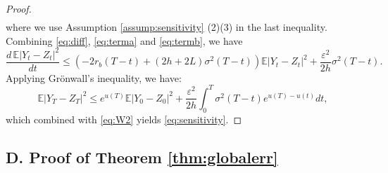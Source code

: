 \documentclass[letterpaper,11pt,reqno]{amsart}
\numberwithin{equation}{section}
\begin{document}
\begin{proof}
\begin{equation}
\begin{aligned}
\end{aligned}
\end{equation}
where we use Assumption \ref{assump:sensitivity} (2)(3) in the last inequality.
Combining \eqref{eq:diff}, \eqref{eq:terma} and \eqref{eq:termb}, we have
\begin{equation}
\label{eq:Gronwall}
\frac{d \, \mathbb{E}|Y_t - Z_t|^2}{dt} \le \left(-2 r_b(T-t) + (2h + 2L) \sigma^2(T-t) \right) \mathbb{E}|Y_t -Z_t|^2
+ \frac{\varepsilon^2}{2h} \sigma^2(T-t).
\end{equation}
Applying Gr\"onwall's inequality, we have:
\begin{equation*}
\mathbb{E}|Y_T - Z_T|^2\leq e^{u(T)}\mathbb{E}|Y_0 - Z_0|^2+ \frac{\varepsilon^2}{2h} \int_0^T \sigma^2(T-t) e^{u(T)-u(t)} dt,
\end{equation*}
which combined with \eqref{eq:W2} yields \eqref{eq:sensitivity}. 
\end{proof}

\subsection*{D. Proof of Theorem \ref{thm:globalerr}}
\end{document}
